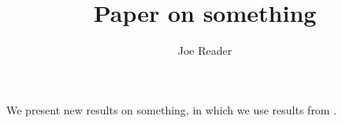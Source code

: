 \documentclass[12pt]{article}
\title{Paper on something}
\author{Joe Reader}
\begin{document}
\maketitle

We present new results on something, 
in which we use results from \citet{miller2016}.




\end{document}
